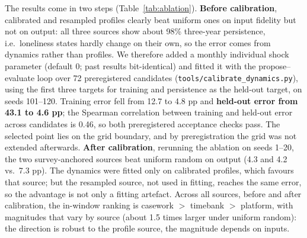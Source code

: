 \documentclass[10pt,twocolumn]{article}
\begin{document}
The results come in two steps (Table~\ref{tab:ablation}). \textbf{Before calibration}, calibrated and resampled profiles clearly beat uniform ones on input fidelity but not on output: all three sources show about 98\% three-year persistence, i.e.\ loneliness states hardly change on their own, so the error comes from dynamics rather than profiles. We therefore added a monthly individual shock parameter (default 0; past results bit-identical) and fitted it with the propose--evaluate loop over 72 preregistered candidates (\texttt{tools/calibrate\_dynamics.py}), using the first three targets for training and persistence as the held-out target, on seeds 101--120. Training error fell from 12.7 to 4.8 pp and \textbf{held-out error from 43.1 to 4.6 pp}; the Spearman correlation between training and held-out error across candidates is 0.46, so both preregistered acceptance checks pass. The selected point lies on the grid boundary, and by preregistration the grid was not extended afterwards. \textbf{After calibration}, rerunning the ablation on seeds 1--20, the two survey-anchored sources beat uniform random on output (4.3 and 4.2 vs.\ 7.3 pp). The dynamics were fitted only on calibrated profiles, which favours that source; but the resampled source, not used in fitting, reaches the same error, so the advantage is not only a fitting artefact. Across all sources, before and after calibration, the in-window ranking is casework $>$ timebank $>$ platform, with magnitudes that vary by source (about 1.5 times larger under uniform random): the direction is robust to the profile source, the magnitude depends on inputs.

\begin{table}[t]
\centering\small
\caption{Profile ablation (rules layer, 20 seeds $\times$ 20 elders). Lower TVD means closer to survey marginals; output error is the mean absolute error over four targets (pp).}
\label{tab:ablation}
\end{table}
\end{document}
